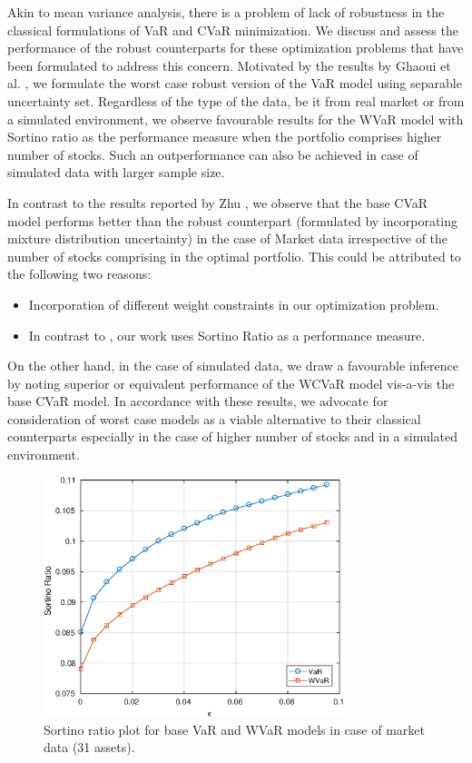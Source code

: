 \documentclass[12pt]{article}
\numberwithin{equation}{section}
\begin{document}
Akin to mean variance analysis, there is a problem of lack of robustness in the classical formulations of VaR and CVaR minimization. We discuss and assess the performance of the robust counterparts for these optimization problems that have been formulated to address this concern. Motivated by the results by Ghaoui et al. \cite{Ghaoui03}, we formulate the worst case robust version of the VaR model using separable uncertainty set. Regardless of the type of the data, be it from real market or from a simulated environment, we observe favourable results for the WVaR model with Sortino ratio as the performance measure when the portfolio comprises higher number of stocks. Such an outperformance can also be achieved in case of simulated data with larger sample size.

In contrast to the results reported by Zhu \cite{Zhu}, we observe that the base CVaR model performs better than the robust counterpart (formulated by incorporating mixture distribution uncertainty) in the case of Market data irrespective of the number of stocks comprising in the optimal portfolio. This could be attributed to the following two reasons:
\begin{itemize}
\item Incorporation of different weight constraints in our optimization problem.
\item In contrast to \cite{Zhu}, our work uses Sortino Ratio as a performance measure.
\end{itemize}
On the other hand, in the case of simulated data, we draw a favourable inference by noting superior or equivalent performance of the WCVaR model vis-a-vis the base CVaR model. In accordance with these results, we advocate for consideration of worst case models as a viable alternative to their classical counterparts especially in the case of higher number of stocks and in a simulated environment.




\newpage

\begin{figure}[!h]
\centering
\includegraphics[height=7.0cm]{var_30m.eps}
\caption{Sortino ratio plot for base VaR and WVaR models in case of market data (31 assets).}
\label{fig:5.1}
\end{figure}
\end{document}
